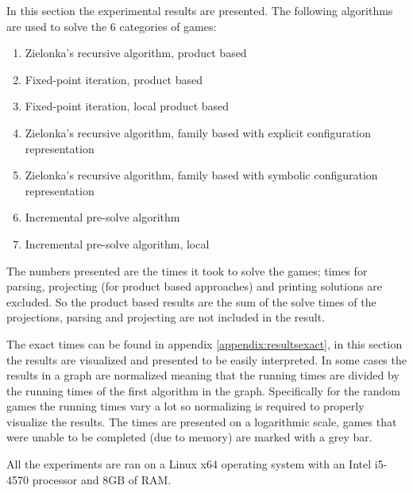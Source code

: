 In this section the experimental results are presented. The following algorithms are used to solve the 6 categories of games:
\begin{enumerate}
	\item Zielonka's recursive algorithm, product based
	\item Fixed-point iteration, product based
	\item Fixed-point iteration, local product based
	\item Zielonka's recursive algorithm, family based with explicit configuration representation
	\item Zielonka's recursive algorithm, family based with symbolic configuration representation
	\item Incremental pre-solve algorithm
	\item Incremental pre-solve algorithm, local
\end{enumerate}

The numbers presented are the times it took to solve the games; times for parsing, projecting (for product based approaches) and printing solutions are excluded. So the product based results are the sum of the solve times of the projections, parsing and projecting are not included in the result.

The exact times can be found in appendix \ref{appendix:resultsexact}, in this section the results are visualized and presented to be easily interpreted. In some cases the results in a graph are normalized meaning that the running times are divided by the running times of the first algorithm in the graph. Specifically for the random games the running times vary a lot so normalizing is required to properly visualize the results. The times are presented on a logarithmic scale, games that were unable to be completed (due to memory) are marked with a grey bar.

All the experiments are ran on a Linux x64 operating system with an Intel i5-4570 processor and 8GB of RAM.

